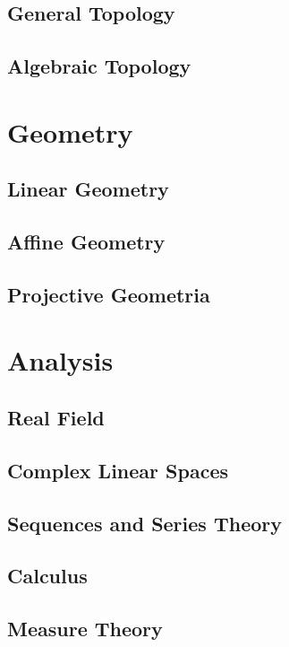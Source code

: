 \documentclass{book}
\begin{document}
	\chapter{General Topology}
	
	\chapter{Algebraic Topology}
	
	\part{Geometry}
	\chapter{Linear Geometry}
	
	\chapter{Affine Geometry}
	
	\chapter{Projective Geometria}
	
	\part{Analysis}
	\chapter{Real Field}
	
	\chapter{Complex Linear Spaces}
	
	\chapter{Sequences and Series Theory}
	
	\chapter{Calculus}
	
	\chapter{Measure Theory}
	
\end{document}
